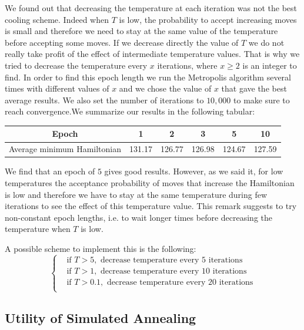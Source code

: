 \documentclass[a4paper]{article}
\begin{document}
We found out that decreasing the temperature at each iteration was not the best cooling scheme. Indeed when $T$ is low, the probability to accept increasing moves is small and therefore we need to stay at the same value of the temperature before accepting some moves. If we decrease directly the value of $T$ we do not really take profit of the effect of intermediate temperature values. That is why we tried to decrease the temperature every $x$ iterations, where $x \geqslant 2$ is an integer to find. In order to find this epoch length we run the Metropolis algorithm several times with different values of $x$ and we chose the value of $x$ that gave the best average results. We also set the number of iterations to $10,000$ to make sure to reach convergence.We summarize our results in the following tabular:
\begin{center}
\begin{tabular}{| c || c | c| c| c| c|}
\hline
Epoch & 1 & 2 & 3 & 5 & 10\\
\hline
Average minimum Hamiltonian & 131.17 & 126.77 & 126.98 & 124.67 & 127.59\\
\hline
\end{tabular}
\end{center}

We find that an epoch of $5$ gives good results. However, as we said it, for low temperatures the acceptance probability of moves that increase the Hamiltonian is low and therefore we have to stay at the same temperature during few iterations to see the effect of this temperature value. This remark suggests to try non-constant epoch lengths, i.e. to wait longer times before decreasing the temperature when $T$ is low.

A possible scheme to implement this is the following:
\begin{equation*}
\left\{
\begin{aligned}
&\textrm{if }T>5, \textrm{ decrease temperature every 5 iterations}\\
&\textrm{if }T>1, \textrm{ decrease temperature every 10 iterations}\\
&\textrm{if }T>0.1, \textrm{ decrease temperature every 20 iterations}\\
\end{aligned}
\right.
\end{equation*}

\subsection{Utility of Simulated Annealing}
\end{document}
